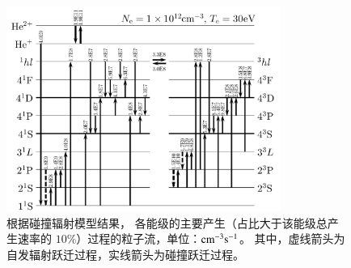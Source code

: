 \begin{figure}
    \centering
    \includegraphics[width=0.8\textwidth]{Ne1E12_Te30_1e7cm-3s-1.pdf}
    \caption{根据碰撞辐射模型结果，
    各能级的主要产生（占比大于该能级总产生速率的 $10\%$）过程的粒子流，单位：${\rm cm}^{-3}{\rm s}^{-1}$。%
    其中，虚线箭头为自发辐射跃迁过程，实线箭头为碰撞跃迁过程。}%
    \label{fig:chap03:main-inflow}
\end{figure}


